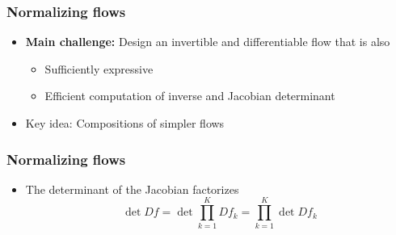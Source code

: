 \documentclass[10pt,aspectratio=169]{beamer}
\begin{document}
\begin{frame}
\begin{columns}
\begin{column}{.3\textwidth}
\begin{center}
\end{center}
\end{column}
\end{columns}
\end{frame}

\begin{frame}
  \frametitle{Normalizing flows}
\small{
\begin{itemize}[<+->]
\item \textbf{Main challenge:} Design an invertible and differentiable flow that is also
\begin{itemize}
\item Sufficiently expressive
\item Efficient computation of inverse and Jacobian determinant
\end{itemize}
\item Key idea: Compositions of simpler flows
\end{itemize}
}
\end{frame}

\begin{frame}
  \frametitle{Normalizing flows}
\small{
\begin{itemize}[<+->]
\item The determinant of the Jacobian factorizes 
$$\det Df=\det \prod_{k=1}^K Df_k=\prod_{k=1}^K \det Df_k$$
\end{itemize}
}
\end{frame}
\end{document}

